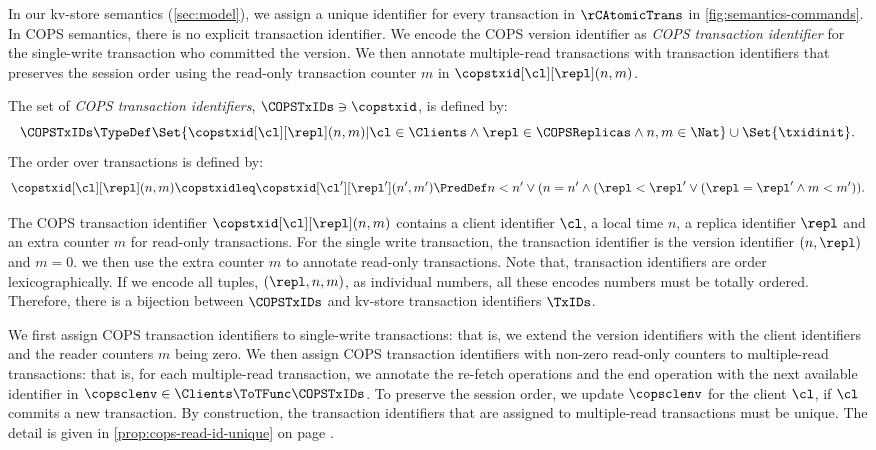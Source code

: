 In our kv-store semantics (\cref{sec:model}), 
we assign a unique identifier for every transaction in \(\rCAtomicTrans\) in \cref{fig:semantics-commands}.
In COPS semantics, there is no explicit transaction identifier.
We encode the COPS version identifier as \emph{COPS transaction identifier}
for the single-write transaction who committed the version.
We then annotate multiple-read transactions with transaction identifiers that preserves the session order
using the read-only transaction counter \( m \) in \(\copstxid[\cl][\repl](n,m)  \).

\begin{definition}
The set of \emph{COPS transaction identifiers}, \( \COPSTxIDs \ni \copstxid \),
is defined by:
\[ 
    \COPSTxIDs \TypeDef \Set{\copstxid[\cl][\repl](n,m) | 
    \cl \in \Clients \land \repl \in \COPSReplicas \land n,m \in \Nat } \cup \Set{\txidinit}.
\]
The order over transactions is defined by:
\[ 
\copstxid[\cl][\repl](n,m) \copstxidleq \copstxid[\cl'][\repl'](n',m')
\PredDef n < n' \lor ( n = n' \land ( \repl < \repl' \lor ( \repl = \repl' \land m < m' ) ) .
\]
\end{definition}

The COPS transaction identifier \(\copstxid[\cl][\repl](n,m)  \) contains
a client identifier \( \cl \), a local time \(n\),
a replica identifier \( \repl \)
and an extra counter \( m \) for read-only transactions.
For the single write transaction, the transaction identifier is the version identifier \( (n,\repl) \) and \( m = 0 \).
we then use the extra counter \( m \) to annotate read-only transactions.
Note that, transaction identifiers are order lexicographically.
If we encode all tuples, \( (\repl,n,m) \), as individual numbers, 
all these encodes numbers must be totally ordered.
Therefore, there is a bijection between \( \COPSTxIDs \) 
and kv-store transaction identifiers \( \TxIDs\).

We first assign COPS transaction identifiers to single-write transactions:
that is, we extend the version identifiers with the client identifiers and the reader counters \( m \) being zero.
We then assign COPS transaction identifiers with non-zero read-only counters to multiple-read transactions:
that is, for each multiple-read transaction, 
we annotate the re-fetch operations and the end operation 
with the next available identifier in \( \copsclenv \in \Clients \ToTFunc \COPSTxIDs  \).
To preserve the session order, we update \( \copsclenv \) for the client \( \cl \),
if \( \cl \) commits a new transaction.
By construction, the transaction identifiers that are assigned to multiple-read transactions must be unique.
The detail is given in \cref{prop:cops-read-id-unique} on page \pageref{sec:proof-multiple-read-trans-id-unique}.

